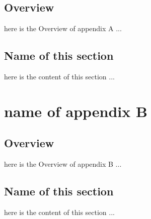 \documentclass[a4paper,twoside,phd]{BYUPhys}
\begin{document}
\section{Overview}
here is the Overview of appendix A ...
\section{Name of this section}
here is the content of this section ...
\chapter{name of appendix B}
\section{Overview}
here is the Overview of appendix B ...
\section{Name of this section}
here is the content of this section ...

%

%

%
\end{document}
